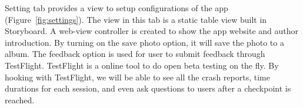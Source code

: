 Setting tab provides a view to setup configurations of the app (Figure~\ref{fig:settings}). The view in this tab is a static table view built in Storyboard. A web-view controller is created to show the app website and author introduction. By turning on the save photo option, it will save the photo to a album. The feedback option is used for user to submit feedback through TestFlight. TestFlight is a online tool to do open beta testing on the fly. By hooking with TestFlight, we will be able to see all the crash reports, time durations for each session, and even ask questions to users after a checkpoint is reached.\\


\begin{figure}
	\centering
	 \hfill

\end{figure}

